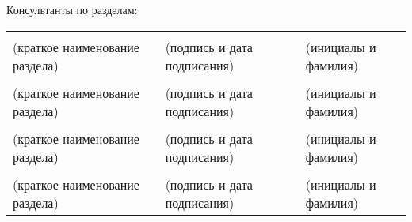 \bigskip
\bigskip

\noindent
Консультанты по разделам: \\
\noindent
\begin{tabularx}{\linewidth}{@{}llYlY@{}}
    &&  &&  \\
    \footnotesize(краткое наименование раздела)\normalsize && \footnotesize(подпись и дата подписания)\normalsize && \footnotesize(инициалы и фамилия)\normalsize \\
    &&  &&  \\
    \footnotesize(краткое наименование раздела)\normalsize && \footnotesize(подпись и дата подписания)\normalsize && \footnotesize(инициалы и фамилия)\normalsize \\
    &&  &&  \\
    \footnotesize(краткое наименование раздела)\normalsize && \footnotesize(подпись и дата подписания)\normalsize && \footnotesize(инициалы и фамилия)\normalsize \\
    &&  &&  \\
    \footnotesize(краткое наименование раздела)\normalsize && \footnotesize(подпись и дата подписания)\normalsize && \footnotesize(инициалы и фамилия)\normalsize
\end{tabularx}


\newpage